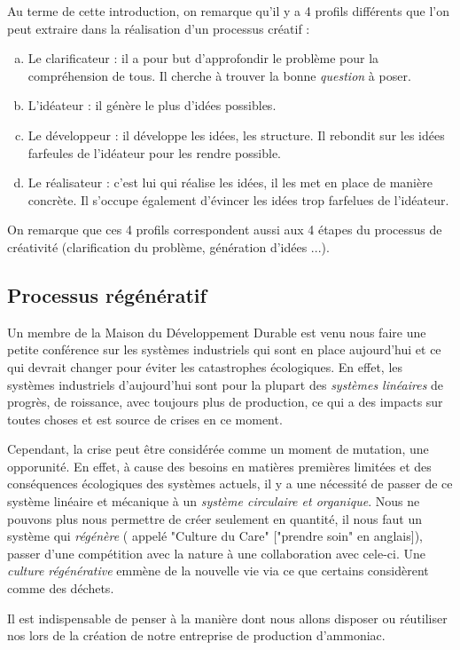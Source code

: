 Au terme de cette introduction, on remarque qu'il y a 4 profils différents que l'on peut 
extraire dans la réalisation d'un processus créatif :
\begin{enumerate}[(a)]
\item Le clarificateur : il a pour but d'approfondir le problème pour la compréhension de tous. 
Il cherche à trouver la bonne \textit{question} à poser.
\item L'idéateur : il génère le plus d'idées possibles.
\item Le développeur : il développe les idées, les structure. Il rebondit sur les idées farfeules 
de l'idéateur pour les rendre possible.
\item Le réalisateur : c'est lui qui réalise les idées, il les met en place de manière concrète. 
Il s'occupe également d'évincer les idées trop farfelues de l'idéateur.
\end{enumerate}

On remarque que ces 4 profils correspondent aussi aux 4 étapes du processus de créativité 
(clarification du problème, génération d'idées ...).

\subsection{Processus régénératif}
Un membre de la Maison du Développement Durable est venu nous faire une petite conférence sur
les systèmes industriels qui sont en place aujourd'hui et ce qui devrait changer pour éviter 
les catastrophes écologiques. En effet, les systèmes industriels d'aujourd'hui sont pour la plupart 
des \textit{systèmes linéaires} de progrès, de roissance, avec toujours plus de production, 
ce qui a des impacts sur toutes choses et est source de crises en ce moment.

Cependant, la crise peut être considérée comme un moment de mutation, une opporunité. 
En effet, à cause des besoins en matières premières limitées et des conséquences écologiques 
des systèmes actuels, il y a une nécessité de passer de ce système linéaire et mécanique à 
un \textit{système circulaire et organique}. Nous ne pouvons plus nous permettre de créer 
seulement en quantité, il nous faut un système qui \textit{régénère} ( appelé "Culture du Care" 
["prendre soin" en anglais]), passer d'une compétition avec la nature à une collaboration avec cele-ci. 
Une \textit{culture régénérative} emmène de la nouvelle vie via ce que certains considèrent comme des déchets.

Il est indispensable de penser à la manière dont nous allons disposer ou réutiliser nos lors de la création de notre entreprise de production d'ammoniac.

